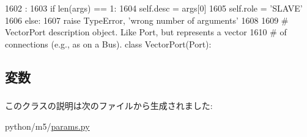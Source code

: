 \begin{DoxyCode}
1602                              :
1603         if len(args) == 1:
1604             self.desc = args[0]
1605             self.role = 'SLAVE'
1606         else:
1607             raise TypeError, 'wrong number of arguments'
1608 
1609 # VectorPort description object.  Like Port, but represents a vector
1610 # of connections (e.g., as on a Bus).
class VectorPort(Port):
\end{DoxyCode}


\subsection{変数}
\hypertarget{classm5_1_1params_1_1SlavePort_aafc566bb08a9f46485e7238669581c2b}{
\subsubsection[{desc}]{}}
\label{classm5_1_1params_1_1SlavePort_aafc566bb08a9f46485e7238669581c2b}
\hypertarget{classm5_1_1params_1_1SlavePort_a4e0cdb878325d53ad79a74504bf97a96}{
\subsubsection[{role}]{}}
\label{classm5_1_1params_1_1SlavePort_a4e0cdb878325d53ad79a74504bf97a96}


このクラスの説明は次のファイルから生成されました:\begin{DoxyCompactItemize}
\item 
python/m5/\hyperlink{params_8py}{params.py}\end{DoxyCompactItemize}

